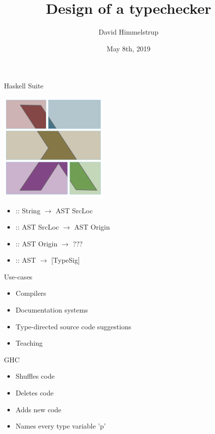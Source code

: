 \documentclass[pdf]{beamer}
\title{Design of a typechecker}
\author{David Himmelstrup}
\date{May 8th, 2019}
\begin{document}
\begin{frame}
  \titlepage
\end{frame}

\begin{frame}{Haskell Suite}
  \begin{center}
    \includegraphics[scale=0.5]{haskell-suite.png}
  \end{center}
\end{frame}

\begin{frame}
  \begin{itemize}
    \item {} :: String $\rightarrow$ AST SrcLoc
    \item {} :: AST SrcLoc $\rightarrow$ AST Origin
    \item {} :: AST Origin $\rightarrow$ ???
    \pause
    \item {} :: AST $\rightarrow$ [TypeSig]
  \end{itemize}
\end{frame}

\begin{frame}{Use-cases}
  \begin{itemize}
    \item Compilers
    \item Documentation systems
    \item Type-directed source code suggestions
    \item Teaching
  \end{itemize}
\end{frame}

\begin{frame}{GHC}
  \begin{itemize}
    \item Shuffles code
    \item Deletes code
    \item Adds new code
    \item Names every type variable 'p'
  \end{itemize}
\end{frame}
\end{document}
